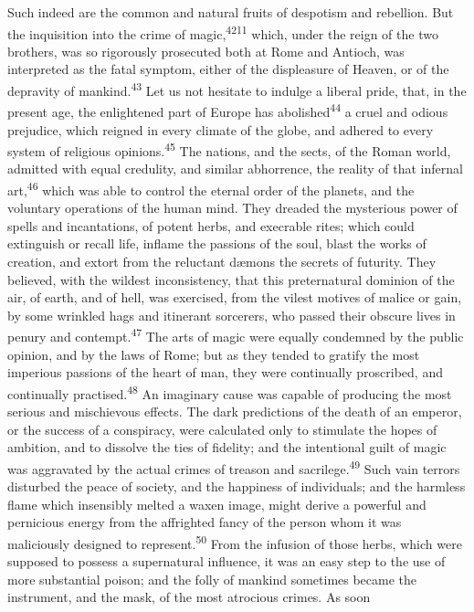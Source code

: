 Such indeed are the common and natural fruits of despotism and
rebellion. But the inquisition into the crime of magic,\textsuperscript{4211}
which, under the reign of the two brothers, was so rigorously
prosecuted both at Rome and Antioch, was interpreted as the fatal
symptom, either of the displeasure of Heaven, or of the depravity
of mankind.\textsuperscript{43} Let us not hesitate to indulge a liberal pride,
that, in the present age, the enlightened part of Europe has
abolished\textsuperscript{44} a cruel and odious prejudice, which reigned in every
climate of the globe, and adhered to every system of religious
opinions.\textsuperscript{45} The nations, and the sects, of the Roman world,
admitted with equal credulity, and similar abhorrence, the
reality of that infernal art,\textsuperscript{46} which was able to control the
eternal order of the planets, and the voluntary operations of the
human mind. They dreaded the mysterious power of spells and
incantations, of potent herbs, and execrable rites; which could
extinguish or recall life, inflame the passions of the soul,
blast the works of creation, and extort from the reluctant dæmons
the secrets of futurity. They believed, with the wildest
inconsistency, that this preternatural dominion of the air, of
earth, and of hell, was exercised, from the vilest motives of
malice or gain, by some wrinkled hags and itinerant sorcerers,
who passed their obscure lives in penury and contempt.\textsuperscript{47} The
arts of magic were equally condemned by the public opinion, and
by the laws of Rome; but as they tended to gratify the most
imperious passions of the heart of man, they were continually
proscribed, and continually practised.\textsuperscript{48} An imaginary cause was
capable of producing the most serious and mischievous effects.
The dark predictions of the death of an emperor, or the success
of a conspiracy, were calculated only to stimulate the hopes of
ambition, and to dissolve the ties of fidelity; and the
intentional guilt of magic was aggravated by the actual crimes of
treason and sacrilege.\textsuperscript{49} Such vain terrors disturbed the peace
of society, and the happiness of individuals; and the harmless
flame which insensibly melted a waxen image, might derive a
powerful and pernicious energy from the affrighted fancy of the
person whom it was maliciously designed to represent.\textsuperscript{50} From the
infusion of those herbs, which were supposed to possess a
supernatural influence, it was an easy step to the use of more
substantial poison; and the folly of mankind sometimes became the
instrument, and the mask, of the most atrocious crimes. As soon
